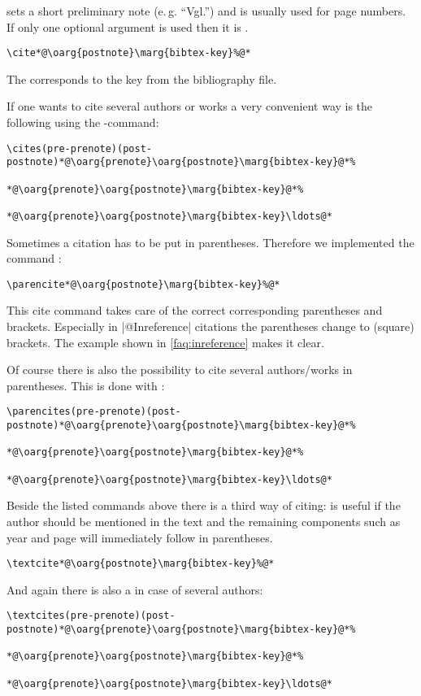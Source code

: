\documentclass[a4paper,
10pt,
greek,
french,
spanish,
italian,
ngerman,
english
]{ltxdoc}
\begin{document}
 sets a short preliminary note (e.\,g. \enquote{Vgl.}) and  is usually used for page numbers.
If only one optional argument is used then it is .
\begin{lstlisting}
\cite*@\oarg{postnote}\marg{bibtex-key}%@*
\end{lstlisting}
The  corresponds to the key from the bibliography file.

\DescribeMacro{\cites}
If one wants to cite several authors or works a very convenient way is the following using the -command:
\begin{lstlisting}
\cites(pre-prenote)(post-postnote)*@\oarg{prenote}\oarg{postnote}\marg{bibtex-key}@*%
 																	*@\oarg{prenote}\oarg{postnote}\marg{bibtex-key}@*%
 																	*@\oarg{prenote}\oarg{postnote}\marg{bibtex-key}\ldots@*
\end{lstlisting}
 
\DescribeMacro{\parencite}
Sometimes a citation has to be put in parentheses. 
Therefore we implemented the command :
\begin{lstlisting}
\parencite*@\oarg{postnote}\marg{bibtex-key}%@*
\end{lstlisting} 
This cite command takes care of the correct corresponding parentheses and brackets.
Especially in |@Inreference| citations the parentheses  change to (square) brackets.
The example shown in \cref{faq:inreference} makes it clear.

\DescribeMacro{\parencites}
Of course there is also the possibility to cite several authors/works in parentheses.
This is done with :
\begin{lstlisting}
\parencites(pre-prenote)(post-postnote)*@\oarg{prenote}\oarg{postnote}\marg{bibtex-key}@*%
 																			*@\oarg{prenote}\oarg{postnote}\marg{bibtex-key}@*%
 																			*@\oarg{prenote}\oarg{postnote}\marg{bibtex-key}\ldots@*
\end{lstlisting}
 
\DescribeMacro{\textcite}
Beside the listed  commands above there is a third way of citing:
 is useful if the author should be mentioned in the text and
the remaining components such as year and page will immediately follow in parentheses. 
\begin{lstlisting}
\textcite*@\oarg{postnote}\marg{bibtex-key}%@*
\end{lstlisting} 

\DescribeMacro{\textcites}
And again there is also a  in case of several authors: 
  \begin{lstlisting}
\textcites(pre-prenote)(post-postnote)*@\oarg{prenote}\oarg{postnote}\marg{bibtex-key}@*%
 																			*@\oarg{prenote}\oarg{postnote}\marg{bibtex-key}@*%
 																			*@\oarg{prenote}\oarg{postnote}\marg{bibtex-key}\ldots@*
\end{lstlisting}
\end{document}
